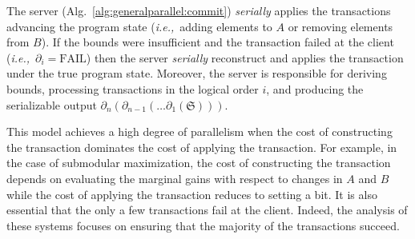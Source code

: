 \documentclass{article} %
\newcommand{\ie}{{\em i.e.,}~}
\newcommand{\Comments}{1}
\newcommand{\note}[2]{\ifnum\Comments=1\textcolor{#1}{#2}\fi}
\newcommand{\xinghao}[1]{\note{red}{[XP: #1]}}
\newcommand{\algref}[1]{Alg.~\ref{#1}}
\begin{document}

The server (\algref{alg:generalparallel:commit}) \emph{serially} applies the transactions advancing the program state (\ie adding elements to $A$ or removing elements from $B$).
If the bounds were insufficient and the transaction failed at the client (\ie $\partial_i = \text{FAIL}$) then the server \emph{serially} reconstruct and applies the transaction under the true program state.
Moreover, the server is responsible for deriving bounds, processing transactions in the logical order $i$, and producing the serializable output $\partial_n (\partial_{n-1}(\ldots \partial_1(\mathfrak{S})))$.





This model achieves a high degree of parallelism when the cost of constructing the transaction dominates the cost of applying the transaction.
For example, in the case of submodular maximization, the cost of constructing the transaction depends on evaluating the marginal gains with respect to changes in $A$ and $B$ while the cost of applying the transaction reduces to setting a bit.
It is also essential that the only a few transactions fail at the client.
Indeed, the analysis of these systems focuses on ensuring that the majority of the transactions succeed.
\end{document}

